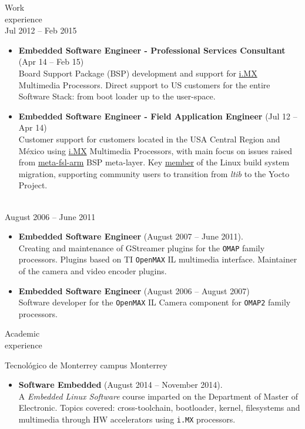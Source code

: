 \documentclass{resume}
\def\itesm{Tecnol\'ogico de Monterrey campus Monterrey}
\def\fsl{Freescale Semiconductor}
\begin{document}
\begin{category}{Work \\experience}
\citem{\fsl}\\
Jul 2012 -- Feb 2015
\begin{itemize}
\item \textbf{Embedded Software Engineer - Professional Services Consultant} (Apr 14 -- Feb 15)\\
  Board Support Package (BSP) development and support for \href{https://www.nxp.com/products/processors-and-microcontrollers/arm-processors/i-mx-applications-processors:IMX_HOME}{i.MX}
  Multimedia Processors. Direct support to US customers for the entire Software Stack: from boot loader up to the user-space.
\end{itemize}

\begin{itemize}
\item \textbf{Embedded Software Engineer - Field Application Engineer} (Jul 12 -- Apr 14)\\
  Customer support for customers located in the USA Central Region and M\'exico using
  \href{https://www.nxp.com/products/processors-and-microcontrollers/arm-processors/i-mx-applications-processors:IMX_HOME}{i.MX}
  Multimedia Processors, with main focus on issues raised from \href{https://git.yoctoproject.org/cgit/cgit.cgi/meta-fsl-arm}{meta-fsl-arm} BSP meta-layer.
  Key \href{https://community.nxp.com/t5/user/viewprofilepage/user-id/25586}{member}
  of the Linux build system migration, supporting community users to transition from \textit{ltib} to the Yocto Project.
\end{itemize}

\\
August 2006 -- June 2011
\begin{itemize}
\item \textbf{Embedded Software Engineer} (August 2007 -- June 2011).\\
  Creating and maintenance of GStreamer plugins for the \texttt{OMAP} family
  processors. Plugins based on TI \texttt{OpenMAX} IL multimedia interface.
  Maintainer of the camera and video encoder plugins.
\item \textbf{Embedded Software Engineer} (August 2006 -- August 2007)\\
  Software developer for the \texttt{OpenMAX} IL Camera component for
  \texttt{OMAP2} family processors.
\end{itemize}
\end{category}

\begin{category}{Academic \\experience}

\citem\itesm\\
\begin{itemize}
\item \textbf{Software Embedded} (August 2014 -- November 2014).\\
  A \textit{Embedded Linux Software} course imparted on the Department of
  Master of Electronic. Topics covered: cross-toolchain, bootloader,
  kernel, filesystems and multimedia through HW accelerators using
  \texttt{i.MX} processors.
\end{itemize}
\end{category}
\end{document}

